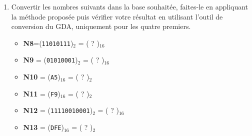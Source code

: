 \documentclass{article}
\begin{document}
\begin{enumerate}
	\item Convertir les nombres suivants dans la base souhaitée, faites-le en appliquant la méthode proposée
		puis vérifier votre résultat en utilisant l'outil de conversion du GDA, uniquement pour les quatre premiers.
		\begin{itemize}
			\item \textbf{N8}=(\texttt{11010111})$_{2}$ = ( ? )$_{16}$\\
\vspace{1em}
\begin{Form}
	\TextField[name=r148,width=\linewidth,height=2.5em,multiline=true,default=N8=]{}
\end{Form}
			\item \textbf{N9} = (\texttt{01010001})$_{2}$ = ( ? )$_{16}$\\
\vspace{1em}
\begin{Form}
	\TextField[name=r148,width=\linewidth,height=2.5em,multiline=true,default=N9=]{}
\end{Form}
			\item \textbf{N10} = (\texttt{A5})$_{16}$ = ( ? )$_{2}$\\
\vspace{1em}
\begin{Form}
	\TextField[name=r148,width=\linewidth,height=2.5em,multiline=true,default=N10=]{}
\end{Form}
			\item \textbf{N11} = (\texttt{F9})$_{16}$  = ( ? )$_{2}$\\
\vspace{1em}
\begin{Form}
	\TextField[name=r148,width=\linewidth,height=2.5em,multiline=true,default=N11=]{}
\end{Form}
			\item \textbf{N12} = (\texttt{11110010001})$_{2}$ = ( ? )$_{16}$\\
\vspace{1em}
\begin{Form}
	\TextField[name=r148,width=\linewidth,height=2.5em,multiline=true,default=N12=]{}
\end{Form}
			\item \textbf{N13} = (\texttt{DFE})$_{16}$ = ( ? )$_{2}$\\
\vspace{1em}
\begin{Form}
	\TextField[name=r148,width=\linewidth,height=2.5em,multiline=true,default=N13=]{}
\end{Form}
		\end{itemize}


\end{enumerate}
\end{document}
